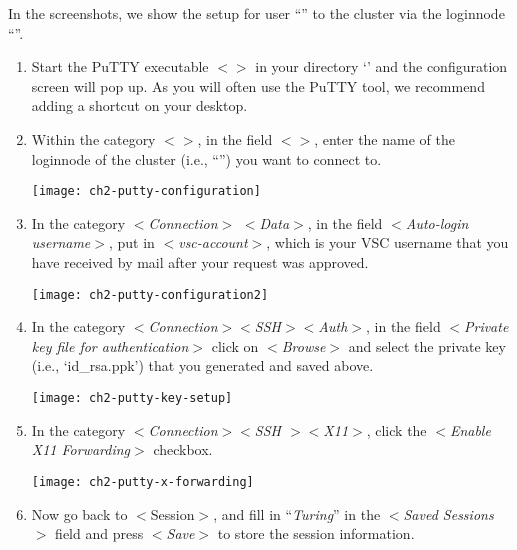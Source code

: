   In the screenshots, we show the setup for user ``''
  to the \hpc cluster via the loginnode
  ``\strong{\emph{\loginnode}}''.

  \begin{enumerate}
    \item  Start the PuTTY executable $<$$>$ in your
      directory `' and the
      configuration screen will pop up. As you will often use the PuTTY tool,
      we recommend adding a shortcut on your desktop.
    \item  Within the category $<$$>$, in the field
      $<$$>$, enter the name of the loginnode of the
      \hpc cluster (i.e., ``\strong{\emph{\loginnode}}'')
      you want to connect to.

    \texttt{[image: ch2-putty-configuration]}

    \item  In the category $<$\emph{Connection}$>$ $<$\emph{Data}$>$, in
      the field $<$\emph{Auto-login username}$>$, put in
      $<$\emph{vsc-account}$>$, which is your VSC username that you have
      received by mail after your request was approved.

  \texttt{[image: ch2-putty-configuration2]}

    \item  In the category $<$\emph{Connection$>$$<$SSH$>$$<$Auth$>$}, in the
      field $<$\emph{Private key file for authentication}$>$ click on
      $<$\emph{Browse}$>$ and select the private key (i.e., `id\_rsa.ppk')
      that you generated and saved above.

  \texttt{[image: ch2-putty-key-setup]}

    \item  In the category $<$\emph{Connection$>$$<$SSH $>$$<$X11$>$}, click
      the $<$\emph{Enable X11 Forwarding}$>$ checkbox.

  \texttt{[image: ch2-putty-x-forwarding]}

    \item  Now go back to $<$Session$>$, and fill in ``\emph{Turing}'' in the
      $<$\emph{Saved Sessions}$>$ field and press $<$\emph{Save}$>$ to
      store the session information.


\end{enumerate}
